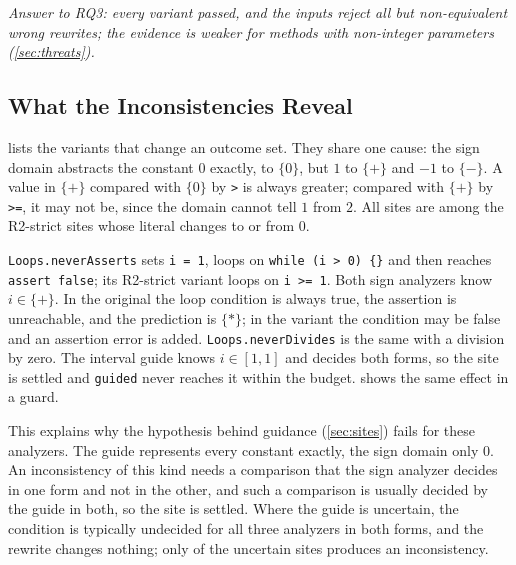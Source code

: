 \emph{Answer to RQ3: every variant passed, and the inputs reject all but
\NumMutantsSurvived{} non-equivalent wrong rewrites; the evidence is weaker for
methods with non-integer parameters (\cref{sec:threats}).}

\subsection{What the Inconsistencies Reveal}
\label{sec:findings}
 lists the variants that change an outcome set. They
share one cause: the sign domain abstracts the constant $0$ exactly, to
$\{0\}$, but $1$ to $\{+\}$ and $-1$ to $\{-\}$. A value in $\{+\}$ compared
with $\{0\}$ by \texttt{>} is always greater; compared with $\{+\}$ by
\texttt{>=}, it may not be, since the domain cannot tell $1$ from $2$. All
\NumInconsistentSitesCrossZero{} sites are among the \NumStrictCrossZero{}
R2-strict sites whose literal changes to or from $0$.

\begin{table}[t]
\caption{The variants with an inconsistency. Guide: the site's status for the
interval guide. Outcomes: ok, assertion error (AE), divide by zero (DZ),
non-termination ($\ast$).}
\label{tab:inconsistencies}
\small

\end{table}

\texttt{Loops.neverAsserts} sets \texttt{i = 1}, loops on
\texttt{while (i > 0) \{\}} and then reaches \texttt{assert false}; its
R2-strict variant loops on \texttt{i >= 1}. Both sign analyzers know
$i\in\{+\}$. In the original the loop condition is always true, the assertion
is unreachable, and the prediction is $\{\ast\}$; in the variant the
condition may be false and an assertion error is added. \texttt{Loops.neverDivides} is the same with a
division by zero. The interval guide knows $i\in[1,1]$ and decides both
forms, so the site is settled and \texttt{guided} never reaches it within the
budget.  shows the same effect in a guard.

This explains why the hypothesis behind guidance (\cref{sec:sites}) fails for
these analyzers. The guide represents every constant exactly, the sign domain
only $0$. An inconsistency of this kind needs a comparison that the sign
analyzer decides in one form and not in the other, and such a comparison is
usually decided by the guide in both, so the site is settled. Where the guide is
uncertain, the condition is typically undecided for all three analyzers in
both forms, and the rewrite changes nothing; only
\NumInconsistentSitesUncertain{} of the \NumUncertain{} uncertain sites
produces an inconsistency.


